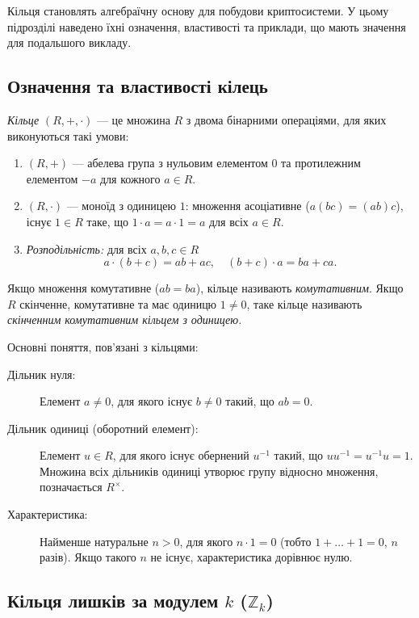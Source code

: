 Кільця становлять алгебраїчну основу для побудови криптосистеми.
У цьому підрозділі наведено їхні означення, властивості та приклади, що мають значення для подальшого викладу.

\subsection{Означення та властивості кілець}
\label{subsec:ring_definition}

\begin{definition}
    \label{def:ring}
    \emph{Кільце} \((R,+,\cdot)\) — це множина \(R\) з двома бінарними операціями, для яких виконуються такі умови:
    \begin{enumerate}
        \item \((R,+)\) — абелева група з нульовим елементом \(0\) та протилежним елементом \(-a\) для кожного \(a\in R\).
        \item \((R,\cdot)\) — моноїд з одиницею \(1\): множення асоціативне (\(a(bc)=(ab)c\)), існує \(1\in R\) таке, що \(1\cdot a = a\cdot 1 = a\) для всіх \(a\in R\).
        \item \emph{Розподільність:} для всіх \(a,b,c\in R\)
        \[
            a\cdot(b + c) = ab + ac, \quad (b + c)\cdot a = ba + ca.
        \]
    \end{enumerate}
    Якщо множення комутативне (\(ab=ba\)), кільце називають \emph{комутативним}.
    Якщо \(R\) скінченне, комутативне та має одиницю \(1\neq0\), таке кільце називають \emph{скінченним комутативним кільцем з одиницею}.
\end{definition}

Основні поняття, пов'язані з кільцями:
\begin{description}
    \item[Дільник нуля:] Елемент \(a\neq0\), для якого існує \(b\neq0\) такий, що \(ab=0\).
    \item[Дільник одиниці (оборотний елемент):] Елемент \(u\in R\), для якого існує обернений \(u^{-1}\) такий, що \(uu^{-1}=u^{-1}u=1\).
    Множина всіх дільників одиниці утворює групу відносно множення, позначається \(R^\times\).
    \item[Характеристика:] Найменше натуральне \(n>0\), для якого \(n\cdot1 = 0\) (тобто \(1+\dots+1=0\), \(n\) разів).
    Якщо такого \(n\) не існує, характеристика дорівнює нулю.
\end{description}

\subsection{Кільця лишків за модулем \(k\) (\(\mathbb{Z}_k\))}
\label{subsec:residue_rings}

